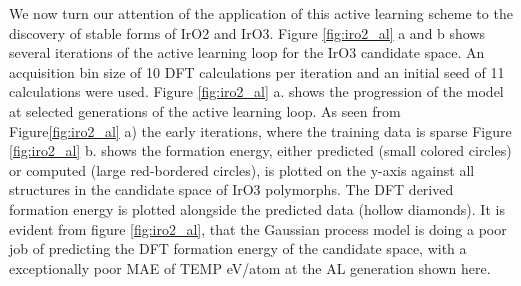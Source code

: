 %
%
We now turn our attention of the application of this active learning scheme to the discovery of stable forms of IrO2 and IrO3.
%
Figure \ref{fig:iro2_al} a and b shows several iterations of the active learning loop for the IrO3 candidate space. 
An acquisition bin size of 10 DFT calculations per iteration and an initial seed of 11 calculations were used.
%
Figure \ref{fig:iro2_al} a. shows the progression of the model at selected generations of the active learning loop.
As seen from Figure\ref{fig:iro2_al} a) the early iterations, where the training data is sparse 
%
Figure \ref{fig:iro2_al} b. shows the formation energy, either predicted (small colored circles) or computed (large red-bordered circles), is plotted on the y-axis against all structures in the candidate space of IrO3 polymorphs.
%
The DFT derived formation energy is plotted alongside the predicted data (hollow diamonds).
%
It is evident from figure \ref{fig:iro2_al}, that the Gaussian process model is doing a poor job of predicting the DFT formation energy of the candidate space, with a exceptionally poor MAE of TEMP eV/atom at the AL generation shown here.
